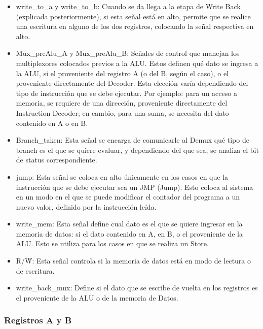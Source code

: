 \begin{itemize}

\item write\_to\_a y write\_to\_b: Cuando se da llega a la etapa de Write Back (explicada posteriormente), si esta señal está en alto, permite que se realice una escritura en alguno de los dos registros, colocando la señal respectiva en alto.

\item Mux\_preAlu\_A y Mux\_preAlu\_B: Señales de control que manejan los multiplexores colocados previos a la ALU. Estos definen qué dato se ingresa a la ALU, si el proveniente del registro A (o del B, según el caso), o el proveniente directamente del Decoder. Esta elección varía dependiendo del tipo de instrucción que se debe ejecutar. Por ejemplo: para un acceso a memoria, se requiere de una dirección, proveniente directamente del Instruction Decoder; en cambio, para una suma, se necesita del dato contenido en A o en B.

\item Branch\_taken: Esta señal se encarga de comunicarle al Demux qué tipo de branch es el que se quiere evaluar, y dependiendo del que sea, se analiza el bit de status correspondiente. 

\item jump: Esta señal se coloca en alto únicamente en los casos en que la instrucción que se debe ejecutar sea un JMP (Jump). Esto coloca al sistema en un modo en el que se puede modificar el contador del programa a un nuevo valor, definido por la instrucción leída.

\item write\_mem: Esta señal define cual dato es el que se quiere ingresar en la memoria de datos: si el dato contenido en A, en B, o el proveniente de la ALU. Esto se utiliza para los casos en que se realiza un Store.

\item R/\~W: Esta señal controla si la memoria de datos está en modo de lectura o de escritura.

\item write\_back\_mux: Define si el dato que se escribe de vuelta en los registros es el proveniente de la ALU o de la memoria de Datos.
\end{itemize}

\subsubsection{Registros A y B}

